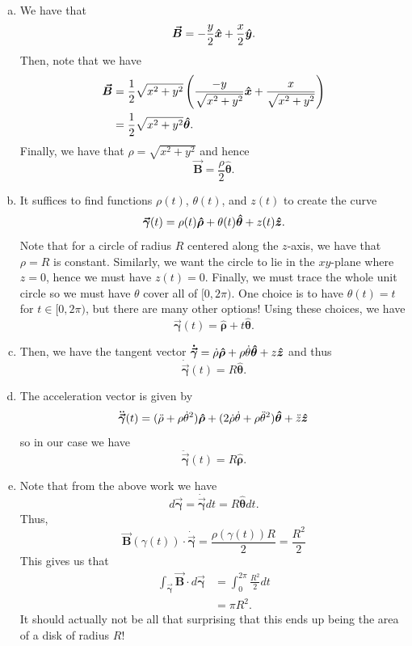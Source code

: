 \documentclass[12pt]{article} %
\newcommand{\curvegamma}{\boldsymbol{\vec{\gamma}}}
\newcommand{\tangentgamma}{\boldsymbol{\dot{\vec{\gamma}}}}
\newcommand{\normalgamma}{\boldsymbol{\ddot{\vec{\gamma}}}}
\newcommand{\thetahat}{\boldsymbol{\hat{\theta}}}
\newcommand{\rhohat}{\boldsymbol{\hat{\rho}}}
\newcommand{\vecfieldB}{\boldsymbol{\vec{B}}}
\begin{document}
\begin{solution}~
\begin{enumerate}[(a)]
    \item We have that
    \[
    \vecfieldB = -\frac{y}{2} \xhat + \frac{x}{2}\yhat.
    \]
    Then, note that we have
    \begin{align*}
        \vecfieldB &= \frac{1}{2}\sqrt{x^2+y^2} \left( \frac{-y}{\sqrt{x^2+y^2}} \xhat + \frac{x}{\sqrt{x^2+y^2}} \right)\\
        &=\frac{1}{2} \sqrt{x^2+y^2} \thetahat.
    \end{align*}
    Finally, we have that $\rho = \sqrt{x^2+y^2}$ and hence
    \[
    \vecfieldB = \frac{\rho}{2} \thetahat.
    \]

    \item It suffices to find functions $\rho(t)$, $\theta(t)$, and $z(t)$ to create the curve
    \[
    \curvegamma(t) = \rho(t) \rhohat + \theta(t) \thetahat + z(t) \zhat.
    \]
    Note that for a circle of radius $R$ centered along the $z$-axis, we have that $\rho=R$ is constant.  Similarly, we want the circle to lie in the $xy$-plane where $z=0$, hence we must have $z(t)=0$.  Finally, we must trace the whole unit circle so we must have $\theta$ cover all of $[0,2\pi)$. One choice is to have $\theta(t)=t$ for $t\in[0,2\pi)$, but there are many other options! Using these choices, we have
    \[
    \curvegamma(t) = \rhohat + t \thetahat.
    \]
    \item Then, we have the tangent vector $\tangentgamma = \dot{\rho}\rhohat + \rho \dot{\theta} \thetahat + z \zhat$ and thus
    \[
    \boxed{\tangentgamma(t) = R \thetahat.}
    \]

	\item The acceleration vector is given by
	\[
	\normalgamma(t) = (\ddot{\rho}+\rho \dot{\theta}^2) \rhohat + (2 \dot{\rho} \dot{\theta}+\rho \ddot{\theta}^2)\thetahat + \ddot{z}\zhat
	\]
	so in our case we have
	\[
	\boxed{\normalgamma(t)= R \rhohat.}
	\]

    \item Note that from the above work we have
    \[
    d \curvegamma = \tangentgamma dt = R \thetahat dt.
    \]
    Thus, 
    \[
    \vecfieldB(\gamma(t)) \cdot \tangentgamma = \frac{\rho(\gamma(t)) R}{2} = \frac{R^2}{2}
    \]
    This gives us that
    \begin{align*}
        \int_{\curvegamma} \vecfieldB \cdot d\curvegamma &= \int_0^{2\pi} \frac{R^2}{2}dt\\
        &= \pi R^2.
    \end{align*}
    It should actually not be all that surprising that this ends up being the area of a disk of radius $R$!


\end{enumerate}
\end{solution}
\end{document}
